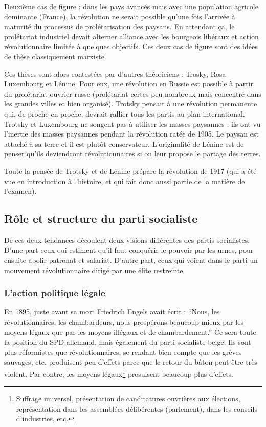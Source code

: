 \documentclass[12pt]{report}
\begin{document}
Deuxième cas de figure : dans les pays avancés mais avec une population agricole dominante (France), la révolution ne serait possible qu’une fois l’arrivée à maturité du processus de prolétarisation des paysans. 
En attendant ça, le prolétariat industriel devait alterner alliance avec les bourgeois libéraux et action révolutionnaire limitée à quelques objectifs.
Ces deux cas de figure sont des idées de thèse classiquement marxiste.

Ces thèses sont alors contestées par d'autres théoriciens : Trosky, Rosa Luxembourg et Lénine. 
Pour eux, une révolution en Russie est possible à partir du prolétariat ouvrier russe (prolétariat certes peu nombreux mais concentré dans les grandes villes et bien organisé).
Trotsky pensait à une révolution permanente qui, de proche en proche, devrait rallier tous les partis au plan international.
Trotsky et Luxembourg ne songent pas à utiliser les masses paysannes : ils ont vu l’inertie des masses paysannes pendant la révolution ratée de 1905.
Le paysan est attaché à sa terre et il est plutôt conservateur.
L'originalité de Lénine est de penser qu’ils deviendront révolutionnaires si on leur propose le partage des terres.

Toute la pensée de Trotsky et de Lénine prépare la révolution de 1917 (qui a été vue en introduction à l'histoire, et qui fait donc aussi partie de la matière de l'examen).

\subsection{Rôle et structure du parti socialiste}

De ces deux tendances découlent deux visions différentes des partis socialistes. D'une part ceux qui estiment qu'il faut conquérir le pouvoir par les urnes, pour ensuite abolir patronat et salariat. D'autre part, ceux qui voient dans le parti un mouvement révolutionnaire dirigé par une élite restreinte.

\subsubsection{L'action politique légale}

En 1895, juste avant sa mort Friedrich Engels avait écrit : \enquote{Nous, les révolutionnaires, les chambardeurs, nous prospérons beaucoup mieux par les moyens légaux que par les moyens illégaux et de chambardement.}
Ce sera toute la position du SPD allemand, mais également du parti socialiste belge.
Ils sont plus réformistes que révolutionnaires, se rendant bien compte que les grèves sauvages, etc. produisent peu d'effets parce que le retour du bâton peut être très violent. 
Par contre, les moyens légaux\footnote{Suffrage universel, présentation de canditatures ouvrières aux élections, représentation dans les assemblées délibérentes (parlement), dans les conseils d'industries, etc.} prosuisent beaucoup plus d'effets.
\end{document}
